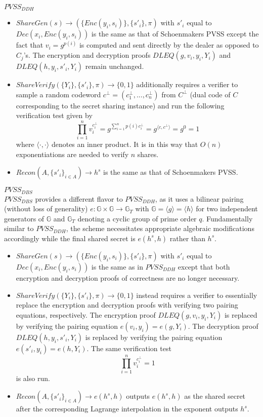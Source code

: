 \documentclass[letterpaper,twocolumn,10pt]{article}
\theoremstyle{definition}
\theoremstyle{remark}
\begin{document}
\noindent\underline{$PVSS_{DDH}$}
\begin{itemize}
\item $ShareGen(s) \rightarrow (\{Enc(y_i, s_i)\}, \{s'_i\}, \pi)$ with $s'_i$ equal to $Dec(x_i, Enc(y_i, s_i))$ is the same as that of Schoenmakers PVSS except the fact that $v_i = g^{p(i)}$ is computed and sent directly by the dealer as opposed to $C_j$'s. The encryption and decryption proofs $DLEQ(g, v_i, y_i, Y_i)$ and $DLEQ(h, y_i, s'_i, Y_i)$ remain unchanged.
\item $ShareVerify(\{Y_i\}, \{s'_i\}, \pi) \rightarrow \{0, 1\}$ additionally requires a verifier to sample a random codeword $c^\perp = (c_1^\perp, ..., c_n^\perp)$ from $C^\perp$ (dual code of $C$ corresponding to the secret sharing instance) and run the following verification test given by
\[
\prod_{i = 1}^n v_i^{c_i^\perp} = g^{\sum_{i = 1}^n p(i) c_i^\perp} = g^{\langle c, c^\perp \rangle} = g^0 = 1
\]
where $\langle \cdot, \cdot \rangle$ denotes an inner product. It is in this way that $O(n)$ exponentiations are needed to verify $n$ shares.
\item $Recon(A, \{s'_i\}_{i \in A}) \rightarrow h^s$ is the same as that of Schoenmakers PVSS.
\end{itemize}

\noindent\underline{$PVSS_{DBS}$}\\
$PVSS_{DBS}$ provides a different flavor to $PVSS_{DDH}$, as it uses a bilinear pairing (without loss of generality) $e: \mathbb{G} \times \mathbb{G} \rightarrow \mathbb{G}_T$ with $\mathbb{G} = \langle g \rangle = \langle h \rangle$ for two independent generators of $\mathbb{G}$ and $\mathbb{G}_T$ denoting a cyclic group of prime order $q$. Fundamentally similar to $PVSS_{DDH}$, the scheme necessitates appropriate algebraic modifications accordingly while the final shared secret is $e(h^s, h)$ rather than $h^s$.
\begin{itemize}
\item $ShareGen(s) \rightarrow (\{Enc(y_i, s_i)\}, \{s'_i\}, \pi)$ with $s'_i$ equal to $Dec(x_i, Enc(y_i, s_i))$ is the same as in $PVSS_{DDH}$ except that both encryption and decryption proofs of correctness are no longer necessary.
\item $ShareVerify(\{Y_i\}, \{s'_i\}, \pi) \rightarrow \{0, 1\}$ instead requires a verifier to essentially replace the encryption and decryption proofs with verifying two pairing equations, respectively. The encryption proof $DLEQ(g, v_i, y_i, Y_i)$ is replaced by verifying the pairing equation $e(v_i, y_i) = e(g, Y_i)$. The decryption proof $DLEQ(h, y_i, s'_i, Y_i)$ is replaced by verifying the pairing equation $e(s'_i, y_i) = e(h, Y_i)$. The same verification test
\[
\prod_{i = 1}^n v_i^{c_i^\perp} = 1
\]
is also run.
\item $Recon(A, \{s'_i\}_{i \in A}) \rightarrow e(h^s, h)$ outputs $e(h^s, h)$ as the shared secret after the corresponding Lagrange interpolation in the exponent outputs $h^s$.
\end{itemize}
\end{document}
